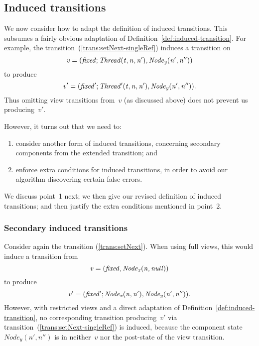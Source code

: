 \subsection{Induced transitions}
\label{sec:singleRef-induced}

We now consider how to adapt the definition of induced transitions.  This
subsumes a fairly obvious adaptation of
Definition~\ref{def:induced-transition}.  For example, the
transition~(\ref{trans:setNext-singleRef}) induces a transition on
\[\mit
v = (fixed; Thread(t, n, n'), Node_y(n', n''))
\]
to produce
\[\mit
v' = (fixed'; Thread'(t, n, n'), Node_y(n', n'')). 
\]
Thus omitting view transitions from~$v$ (as discussed above) does not prevent
us producing~$v'$. 

However, it turns out that we need to:
\begin{enumerate}
\item consider another form of induced transitions, concerning secondary
  components from the extended transition; and

\item enforce extra conditions for induced transitions, in order to avoid our
  algorithm discovering certain false errors.
\end{enumerate}
%
We discuss point~1 next; we then give our revised definition of induced
transitions; and then justify the extra conditions mentioned in point~2.


\subsubsection{Secondary induced transitions}
\label{ssec:c2Refs}


Consider again the transition (\ref{trans:setNext}).  When using full views,
this would induce a transition from 
\[\mit
v = (fixed,  Node_x(n, null))\]
to produce
\[\mit
v' = (fixed';  Node_x(n, n'), Node_y(n', n'')).
\]
However, with restricted views and a direct adaptation of
Definition~\ref{def:induced-transition}, no corresponding transition
producing~$v'$ via transition~(\ref{trans:setNext-singleRef}) is induced,
because the component state $Node_y(n', n'')$ is in neither~$v$ nor the
post-state of the view transition.

